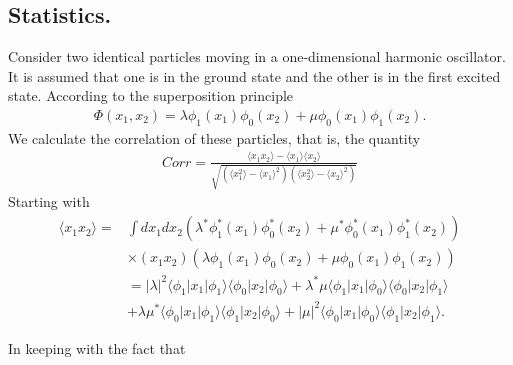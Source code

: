 \begin{subappendices}
   

\section{Statistics.}\label{App6D}
Consider two identical particles moving in a one-dimensional harmonic oscillator. It is assumed  that one is in the ground state and the other  is in the first excited state. According to the superposition principle 
\begin{align}\label{eqApp6G1}
\Phi(x_1,x_2)=\lambda\phi_1(x_1)\phi_0(x_2)+\mu\phi_0(x_1)\phi_1(x_2).
\end{align} 
We calculate the correlation of these particles, that is, the quantity
\begin{align}\label{eqApp6G2}
Corr=\frac{\langle x_1x_2\rangle-\langle x_1\rangle\langle x_2\rangle}{\sqrt{\left(\langle x_1^2\rangle-\langle x_1\rangle^2\right)\left(\langle x_2^2\rangle-\langle x_2\rangle^2\right)}}
\end{align} 
Starting with
\begin{align}\label{eqApp63}
\nonumber\langle x_1x_2\rangle=&\int dx_1 dx_2 \left(\lambda^*\phi_1^*(x_1)\phi_0^*(x_2)+\mu^*\phi_0^*(x_1)\phi_1^*(x_2)\right)\\
\nonumber&\times(x_1 x_2)\left(\lambda\phi_1(x_1)\phi_0(x_2)+\mu\phi_0(x_1)\phi_1(x_2)\right)\\
\nonumber &=|\lambda|^2\langle\phi_1|x_1|\phi_1\rangle\langle\phi_0|x_2|\phi_0\rangle+\lambda^*\mu\langle\phi_1|x_1|\phi_0\rangle\langle\phi_0|x_2|\phi_1\rangle\\
&+\lambda\mu^*\langle\phi_0|x_1|\phi_1\rangle\langle\phi_1|x_2|\phi_0\rangle+|\mu|^2\langle\phi_0|x_1|\phi_0\rangle\langle\phi_1|x_2|\phi_1\rangle.
\end{align} 

In keeping with the fact that


\end{subappendices}
